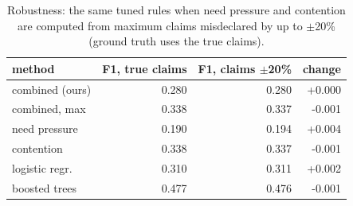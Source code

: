 \begin{table}[t]
\centering
\footnotesize
\caption{Robustness: the same tuned rules when need pressure and contention are computed from maximum claims misdeclared by up to $\pm$20\% (ground truth uses the true claims).}
\label{tab:robust}
\begin{tabular}{lrrr}
\toprule
method & F1, true claims & F1, claims $\pm$20\% & change \\
\midrule
combined (ours) & 0.280 & 0.280 & +0.000 \\
combined, max & 0.338 & 0.337 & -0.001 \\
need pressure & 0.190 & 0.194 & +0.004 \\
contention & 0.338 & 0.337 & -0.001 \\
logistic regr. & 0.310 & 0.311 & +0.002 \\
boosted trees & 0.477 & 0.476 & -0.001 \\
\bottomrule
\end{tabular}
\end{table}
